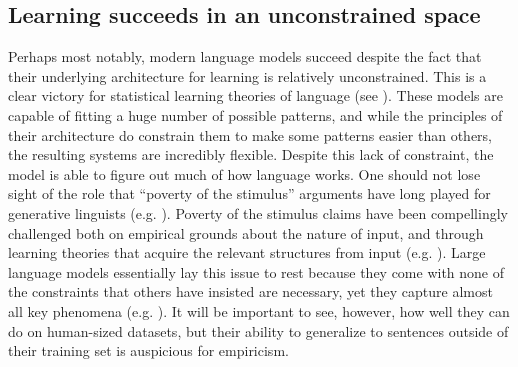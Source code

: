 \documentclass[output=paper,colorlinks,citecolor=brown
]{langscibook}
\begin{document}


\subsection{Learning succeeds in an unconstrained space}

Perhaps most notably, modern language models succeed despite the fact that their underlying architecture for learning is relatively unconstrained. This is a clear victory for statistical learning theories of language (see \citealt{contreras2023large}). These models are capable of fitting a huge number of possible patterns, and while the principles of their architecture do constrain them to make some patterns easier than others, the resulting systems are incredibly flexible. Despite this lack of constraint, the model is able to figure out much of how language works. One should not lose sight of the role that ``poverty of the stimulus'' arguments have long played for generative linguists (e.g. \citealt{lasnik2016argument,crain2001nature,legate2002empirical,wexler1980formal,laurence2001poverty,pearl2022poverty,crain2002language}). Poverty of the stimulus claims have been compellingly challenged both on empirical grounds about the nature of input, and through learning theories that acquire the relevant structures from input (e.g. \citealt{pullum2002empirical,clark2010linguistic,perfors2011learnability,reali2005uncovering,solan2005unsupervised}). Large language models essentially lay this issue to rest because they come with none of the constraints that others have insisted are necessary, yet they capture almost all key phenomena (e.g. \citealt{wilcox2022using}). It will be important to see, however, how well they can do on human-sized datasets, but their ability to generalize to sentences outside of their training set is auspicious for empiricism.
\end{document}
